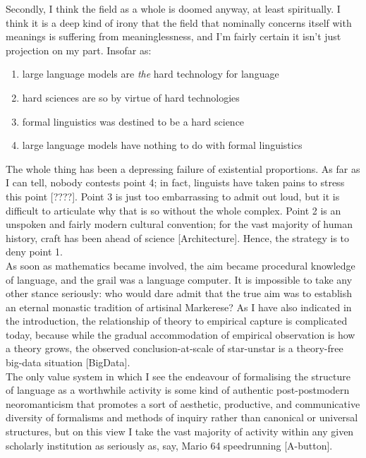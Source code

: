 Secondly, I think the field as a whole is doomed anyway, at least spiritually. I think it is a deep kind of irony that the field that nominally concerns itself with meanings is suffering from meaninglessness, and I'm fairly certain it isn't just projection on my part. Insofar as:
\begin{enumerate}
\item large language models are \emph{the} hard technology for language
\item hard sciences are so by virtue of hard technologies
\item formal linguistics was destined to be a hard science
\item large language models have nothing to do with formal linguistics
\end{enumerate}
The whole thing has been a depressing failure of existential proportions. As far as I can tell, nobody contests point 4; in fact, linguists have taken pains to stress this point [????]. Point 3 is just too embarrassing to admit out loud, but it is difficult to articulate why that is so without the whole complex. Point 2 is an unspoken and fairly modern cultural convention; for the vast majority of human history, craft has been ahead of science [Architecture]. Hence, the strategy is to deny point 1.\\

As soon as mathematics became involved, the aim became procedural knowledge of language, and the grail was a language computer. It is impossible to take any other stance seriously: who would dare admit that the true aim was to establish an eternal monastic tradition of artisinal Markerese? As I have also indicated in the introduction, the relationship of theory to empirical capture is complicated today, because while the gradual accommodation of empirical observation is how a theory grows, the observed conclusion-at-scale of star-unstar is a theory-free big-data situation [BigData]. \\



The only value system in which I see the endeavour of formalising the structure of language as a worthwhile activity is some kind of authentic post-postmodern neoromanticism that promotes a sort of aesthetic, productive, and communicative diversity of formalisms and methods of inquiry rather than canonical or universal structures, but on this view I take the vast majority of activity within any given scholarly institution as seriously as, say, Mario 64 speedrunning [A-button]. 